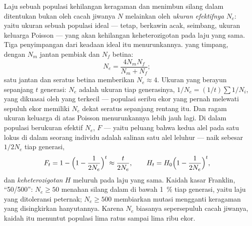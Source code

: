 \begin{theorem}\label{thm:b3:conservation-biology:ne}
%
Laju sebuah populasi kehilangan keragaman dan menimbun silang dalam
ditentukan bukan oleh cacah jiwanya $N$ melainkan oleh \emph{ukuran
efektifnya} $N_{e}$: yaitu ukuran sebuah populasi ideal --- tetap,
berkawin acak,  seimbang, ukuran keluarga Poisson --- yang
akan kehilangan keheterozigotan pada laju yang sama. Tiga penyimpangan
dari keadaan ideal itu menurunkannya.  yang timpang, dengan
$N_{m}$ jantan pembiak dan $N_{f}$ betina:
\[
N_{e} = \frac{4N_{m}N_{f}}{N_{m} + N_{f}} ;
\]
satu jantan dan seratus betina memberikan $N_{e} \approx 4$. Ukuran yang
berayun sepanjang $t$ generasi: $N_{e}$ adalah \emph{}
ukuran tiap generasinya, $1/N_{e} = (1/t)\sum 1/N_{i}$, yang dikuasai oleh
yang terkecil --- populasi seribu ekor yang pernah melewati sepuluh ekor
memiliki $N_{e}$ dekat seratus sepanjang rentang itu. Dan ragam ukuran
keluarga di atas Poisson menurunkannya lebih jauh lagi. Di dalam populasi
berukuran efektif $N_{e}$, \emph{} $F$ --- yaitu
peluang bahwa kedua alel pada satu lokus di dalam seorang individu adalah
salinan satu alel leluhur --- naik sebesar $1/2N_{e}$ tiap generasi,
\[
F_{t} = 1 - \Bigl(1 - \frac{1}{2N_{e}}\Bigr)^{t} \approx \frac{t}{2N_{e}},
\qquad H_{t} = H_{0}\Bigl(1 - \frac{1}{2N_{e}}\Bigr)^{t} ,
\]
dan \emph{keheterozigotan} $H$ meluruh pada laju yang sama. Kaidah kasar
Franklin, ``50/500'': $N_{e} \ge 50$ menahan silang dalam di bawah
\qty{1}{\%} tiap generasi, yaitu laju yang ditoleransi peternak; $N_{e} \ge
500$ membiarkan mutasi mengganti keragaman yang disingkirkan hanyutannya.
Karena $N_{e}$ biasanya sepersepuluh cacah jiwanya, kaidah itu menuntut
populasi lima ratus sampai lima ribu ekor.
\end{theorem}
